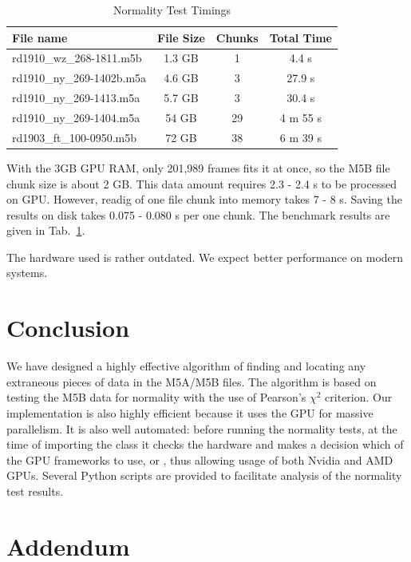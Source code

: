 \documentclass[letterpaper,twoside,12pt]{article}
\begin{document}
\begin{table}[ht!]
  \begin{center}
    \caption{Normality Test Timings}
    \label{timings}
    \begin{tabular}{l|c|c|c}
      \textbf{File name} & \textbf{File Size} & \textbf{Chunks} & \textbf{Total Time} \\
      \hline
      rd1910\_wz\_268-1811.m5b & 1.3 GB & 1 &  4.4 s \\
      rd1910\_ny\_269-1402b.m5a & 4.6 GB & 3 & 27.9 s \\
      rd1910\_ny\_269-1413.m5a & 5.7 GB & 3 & 30.4 s \\
      rd1910\_ny\_269-1404.m5a & 54 GB & 29 & 4 m 55 s \\
      rd1903\_ft\_100-0950.m5b & 72 GB & 38 & 6 m 39 s\\
    \end{tabular}
  \end{center}
\end{table}

With the 3GB GPU RAM, only 201,989 frames fits it at once, so the M5B file chunk size is about 2 GB. This data amount requires 2.3 - 2.4 s to be processed on GPU. However, readig of one file chunk into memory takes 7 - 8 s. Saving the results on disk takes 0.075 - 0.080 s per one chunk. The benchmark results are given in Tab.~\ref{timings}.

The hardware used is rather outdated. We expect better performance on modern systems. 
 

\section{Conclusion}

We have designed a highly effective algorithm of finding and locating any extraneous pieces of data in the M5A/M5B files. The algorithm is based on testing the M5B data for normality with the use of Pearson's $\chi^2$ criterion. Our implementation is also highly efficient because it uses the GPU for massive parallelism. It is also well automated: before running the normality tests, at the time of importing the class \verb@Normtest@ it checks the hardware and makes a decision which of the GPU frameworks to use, \verb@CUDA@ or \verb@OpenCL@, thus allowing usage of both Nvidia and AMD GPUs. Several Python scripts are provided to facilitate analysis of the normality test results.


\newpage

\section*{Addendum}
\end{document}
